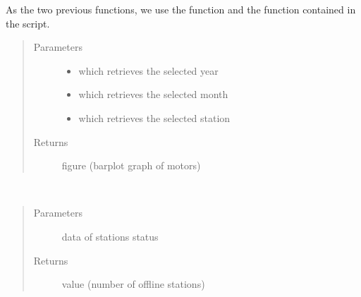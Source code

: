 \documentclass[letterpaper,10pt,english]{sphinxmanual}
\begin{document}
\begin{fulllineitems}
\label{\detokenize{app:update_figure_motors}}
\sphinxAtStartPar
As the two previous functions, we use the  function and the  function contained in the  script.
\begin{quote}\begin{description}
\item[{Parameters}] \leavevmode\begin{itemize}
\item {} 
\sphinxAtStartPar
{} \textendash{} which retrieves the selected year

\item {} 
\sphinxAtStartPar
{} \textendash{} which retrieves the selected month

\item {} 
\sphinxAtStartPar
{} \textendash{} which retrieves the selected station

\end{itemize}

\item[{Returns}] \leavevmode
\sphinxAtStartPar
figure (barplot graph of motors)

\end{description}\end{quote}

\end{fulllineitems}


\begin{fulllineitems}
\label{\detokenize{app:update_offline}}~\begin{quote}\begin{description}
\item[{Parameters}] \leavevmode
\sphinxAtStartPar
{} \textendash{} data of stations status

\item[{Returns}] \leavevmode
\sphinxAtStartPar
value (number of offline stations)

\end{description}\end{quote}

\end{fulllineitems}
\end{document}
